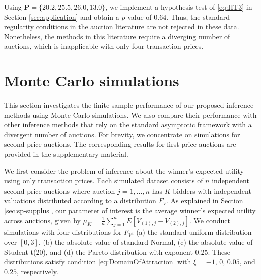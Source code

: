 \begin{runningexamplecont}
Using $\mathbf{P} = \{20.2, 25.5, 26.0, 13.0\}$, we implement a hypothesis test of \eqref{eq:HT3} in Section \ref{sec:application} and obtain a $p$-value of 0.64. Thus, the standard regularity conditions in the auction literature are not rejected in these data. Nonetheless, the methods in this literature require a diverging number of auctions, which is inapplicable with only four transaction prices.
\end{runningexamplecont}





\section{Monte Carlo simulations \label{sec:simulation}}

This section investigates the finite sample performance of our proposed inference methods using Monte Carlo simulations. We also compare their performance with other inference methods that rely on the standard asymptotic framework with a divergent number of auctions. For brevity, we concentrate on simulations for second-price auctions. The corresponding results for first-price auctions are provided in the supplementary material.


We first consider the problem of inference about the winner's expected utility using only transaction prices. Each simulated dataset consists of $n$ independent second-price auctions where auction $j=1,\dots ,n$ has $K$ bidders with independent valuations distributed according to a distribution $F_V$. As explained in Section \ref{sec:sp-supplus}, our parameter of interest is the average winner's expected utility across auctions, given by $\mu _{K}= \frac{1}{n}\sum_{j=1}^{n}E[V_{(1),j}-V_{(2),j}]$. We conduct simulations with four distributions for $F_V$: (a) the standard uniform distribution over $[0,3]$, (b) the absolute value of standard Normal, (c) the absolute value of Student-t(20), and (d) the Pareto distribution with exponent 0.25. These distributions satisfy condition \eqref{eq:DomainOfAttraction} with $\xi = -1$, $0$, $0.05$, and $0.25$, respectively.

